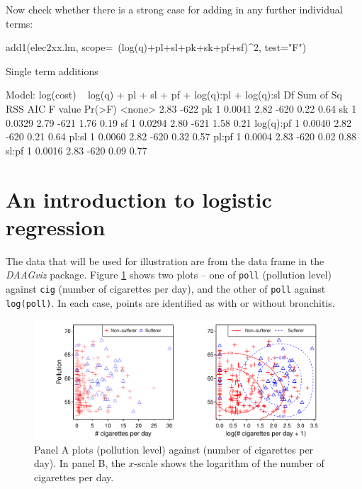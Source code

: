 Now check whether there is a strong case for adding in any further
individual terms:
\begin{fullwidth}
\begin{Schunk}
\begin{Sinput}
add1(elec2xx.lm, scope=~(log(q)+pl+sl+pk+sk+pf+sf)^2, test="F")
\end{Sinput}
\begin{Soutput}
Single term additions

Model:
log(cost) ~ log(q) + pl + sl + pf + log(q):pl + log(q):sl
          Df Sum of Sq  RSS  AIC F value Pr(>F)
<none>                 2.83 -622               
pk         1    0.0041 2.82 -620    0.22   0.64
sk         1    0.0329 2.79 -621    1.76   0.19
sf         1    0.0294 2.80 -621    1.58   0.21
log(q):pf  1    0.0040 2.82 -620    0.21   0.64
pl:sl      1    0.0060 2.82 -620    0.32   0.57
pl:pf      1    0.0004 2.83 -620    0.02   0.88
sl:pf      1    0.0016 2.83 -620    0.09   0.77
\end{Soutput}
\end{Schunk}
\end{fullwidth}

\section{An introduction to logistic regression}\label{sec:logistic}





The data that will be used for illustration are from the data frame
 in the {\em DAAGviz} package.  Figure \ref{fig:cig-poll} 
shows two plots -- one of \texttt{poll}
(pollution level) against \texttt{cig} (number of cigarettes per day),
and the other of \texttt{poll} against \texttt{log(poll)}.  In each
case, points are identified as with or without bronchitis.

\begin{figure}
\begin{Schunk}


\centerline{\includegraphics[width=0.95\textwidth]{figs/8-bronchitAB-1} }

\end{Schunk}
\caption{Panel A plots  (pollution level) against
   (number of cigarettes per day).  In panel B, the
  $x$-scale shows the logarithm of the number of cigarettes per
  day.\label{fig:cig-poll}}
\vspace*{12pt}
\end{figure}


